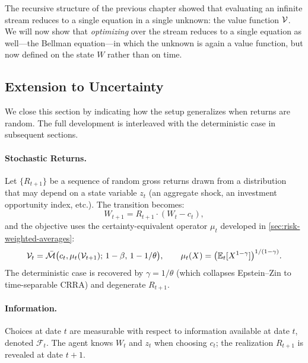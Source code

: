 \begin{calloutimportant}
The recursive structure of the previous chapter showed that evaluating an infinite stream reduces to a single equation in a single unknown: the value function $\mathcal{V}$. We will now show that \emph{optimizing} over the stream reduces to a single equation as well---the Bellman equation---in which the unknown is again a value function, but now defined on the state $W$ rather than on time.
\end{calloutimportant}

\subsection{Extension to Uncertainty}
\label{subsec:dp-stochastic}

We close this section by indicating how the setup generalizes when returns are random. The full development is interleaved with the deterministic case in subsequent sections.

\paragraph{Stochastic Returns.}
Let $\{R_{t+1}\}$ be a sequence of random gross returns drawn from a distribution that may depend on a state variable $z_t$ (an aggregate shock, an investment opportunity index, etc.). The transition becomes:
\begin{equation}
W_{t+1} = R_{t+1} \cdot (W_t - c_t),
\label{eq:dp-transition-stochastic}
\end{equation}
and the objective uses the certainty-equivalent operator $\mu_t$ developed in \cref{sec:risk-weighted-averages}:
\begin{equation}
\mathcal{V}_t = \bar{\mathcal{M}}\big( c_t, \mu_t(\mathcal{V}_{t+1}); \, 1-\beta, \, 1 - 1/\theta \big), \qquad
\mu_t(X) = \big( \mathbb{E}_t[X^{1-\gamma}] \big)^{1/(1-\gamma)}.
\label{eq:dp-ez-objective}
\end{equation}
The deterministic case is recovered by $\gamma = 1/\theta$ (which collapses Epstein--Zin to time-separable CRRA) and degenerate $R_{t+1}$.

\paragraph{Information.}
Choices at date $t$ are measurable with respect to information available at date $t$, denoted $\mathcal{F}_t$. The agent knows $W_t$ and $z_t$ when choosing $c_t$; the realization $R_{t+1}$ is revealed at date $t+1$.

